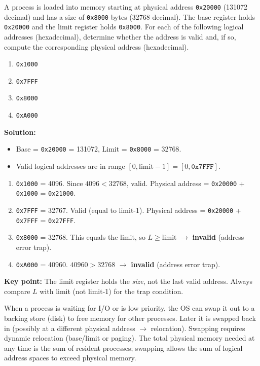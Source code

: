 \documentclass[11pt]{article}
\newcommand{\cle}[1]{{\popxbold\color{popdark}#1}}
\begin{document}
\begin{exoresolu}
A process is loaded into memory starting at physical address \texttt{0x20000} (131072 decimal) and has a size of \texttt{0x8000} bytes (32768 decimal). The base register holds \texttt{0x20000} and the limit register holds \texttt{0x8000}. For each of the following logical addresses (hexadecimal), determine whether the address is valid and, if so, compute the corresponding physical address (hexadecimal).
\begin{enumerate}
\item \texttt{0x1000}
\item \texttt{0x7FFF}
\item \texttt{0x8000}
\item \texttt{0xA000}
\end{enumerate}
\tcblower
\textbf{Solution:}
\begin{itemize}
\item Base = \texttt{0x20000} = 131072, Limit = \texttt{0x8000} = 32768.
\item Valid logical addresses are in range $[0, \text{limit}-1] = [0, \texttt{0x7FFF}]$.
\end{itemize}
\begin{enumerate}
\item \texttt{0x1000} = 4096. Since $4096 < 32768$, valid. Physical address = \texttt{0x20000} + \texttt{0x1000} = \texttt{0x21000}.
\item \texttt{0x7FFF} = 32767. Valid (equal to limit-1). Physical address = \texttt{0x20000} + \texttt{0x7FFF} = \texttt{0x27FFF}.
\item \texttt{0x8000} = 32768. This equals the limit, so $L \ge \text{limit}$ $\rightarrow$ \textbf{invalid} (address error trap).
\item \texttt{0xA000} = 40960. $40960 > 32768$ $\rightarrow$ \textbf{invalid} (address error trap).
\end{enumerate}
\textbf{Key point:} The limit register holds the \emph{size}, not the last valid address. Always compare $L$ with limit (not limit-1) for the trap condition.
\end{exoresolu}

\begin{aretenir}[Swapping]
When a process is waiting for I/O or is low priority, the OS can \cle{swap} it out to a \cle{backing store} (disk) to free memory for other processes. Later it is swapped back in (possibly at a different physical address $\rightarrow$ relocation). Swapping requires dynamic relocation (base/limit or paging). The total physical memory needed at any time is the sum of resident processes; swapping allows the sum of logical address spaces to exceed physical memory.
\end{aretenir}
\end{document}
